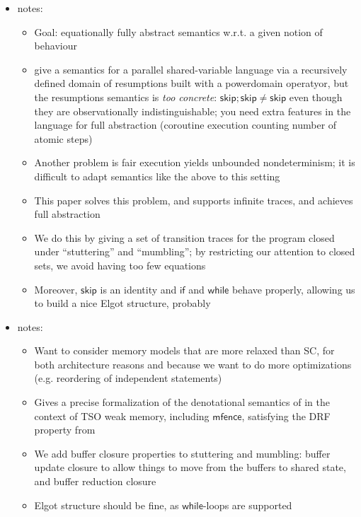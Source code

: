 \documentclass[acmsmall,screen,review]{acmart}
\newcommand{\ms}[1]{\ensuremath{\mathsf{#1}}}
\begin{document}
\begin{itemize}
  \item \citet{brookes-full-abstraction-96} notes:
  \begin{itemize}
    \item Goal: equationally fully abstract semantics w.r.t. a given notion of behaviour
    \item \citet{hennessy-parallel-79} give a semantics for a parallel shared-variable language via
    a recursively defined domain of resumptions built with a powerdomain operatyor, but the
    resumptions semantics is \emph{too concrete}: $\ms{skip} ; \ms{skip} \neq \ms{skip}$ even though
    they are observationally indistinguishable; you need extra features in the language for full
    abstraction (coroutine execution counting number of atomic steps)
    \item Another problem is fair execution yields unbounded nondeterminism; it is difficult to
    adapt semantics like the above to this setting
    \item This paper solves this problem, and supports infinite traces, and achieves full
    abstraction
    \item We do this by giving a set of transition traces for the program closed under
    ``stuttering'' and ``mumbling''; by restricting our attention to closed sets, we avoid having
    too few equations
    \item Moreover, $\ms{skip}$ is an identity and $\ms{if}$ and $\ms{while}$ behave properly,
    allowing us to build a nice Elgot structure, probably
  \end{itemize}
  \item \citet{jagadeesan-brookes-relaxed-12} notes:
  \begin{itemize}
    \item Want to consider memory models that are more relaxed than SC, for both architecture
    reasons and because we want to do more optimizations (e.g. reordering of independent statements)
    \item Gives a precise formalization of the denotational semantics of
    \citet{brookes-full-abstraction-96} in the context of TSO weak memory, including $\ms{mfence}$,
    satisfying the DRF property from \citet{adve-drf-98}
    \item We add buffer closure properties to stuttering and mumbling: buffer update closure to
    allow things to move from the buffers to shared state, and buffer reduction closure
    \item Elgot structure should be fine, as $\ms{while}$-loops are supported

\end{itemize}
\end{itemize}
\end{document}
